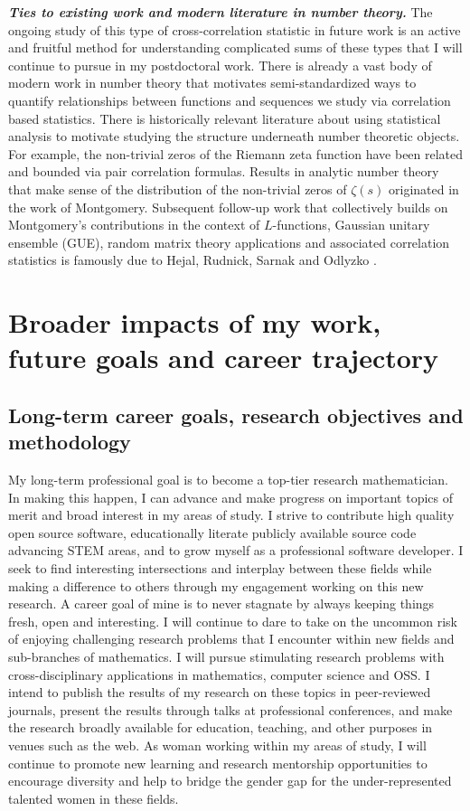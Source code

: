 \documentclass[10pt,reqno,letterpaper]{article}
\theoremstyle{plain}
\numberwithin{theorem}{section}
\theoremstyle{definition}
\begin{document}
\noindent
{\small \textbf{\emph{Ties to existing work and modern literature in number theory.}}} 
The ongoing study of this type of cross-correlation statistic in future work is an active and 
fruitful method for understanding complicated sums of these types 
that I will continue to pursue in my postdoctoral work. 
There is already a vast body of modern work in number theory that motivates 
semi-standardized ways to quantify relationships between functions and sequences we study via 
correlation based statistics. There is historically relevant literature about using 
statistical analysis to motivate studying the structure underneath number theoretic objects. 
For example, the non-trivial zeros of the Riemann zeta function have been related and 
bounded via pair correlation formulas. 
Results in analytic number theory that make sense of the distribution of the 
non-trivial zeros of $\zeta(s)$ originated in the work of Montgomery. 
Subsequent follow-up work that collectively builds on Montgomery’s contributions in the 
context of $L$-functions, Gaussian unitary ensemble (GUE), 
random matrix theory applications and associated correlation statistics is 
famously due to Hejal, Rudnick, Sarnak and Odlyzko 
\cite{WILLIAMS-BARRETT-SURVEY-2016}. 

\section{Broader impacts of my work, future goals and career trajectory}

\subsection{Long-term career goals, research objectives and methodology} 

My long-term professional goal is to become a top-tier research mathematician. In making this happen, 
I can advance and make progress on important topics of merit and broad interest in my areas of study. 
I strive to contribute high quality open source software, educationally 
literate publicly available source code advancing STEM areas, and to grow myself as a 
professional software developer. 
I seek to find interesting intersections and interplay between these fields while making 
a difference to others through my engagement working on this new research. 
A career goal of mine is to never stagnate by always keeping things 
fresh, open and interesting. I will continue to dare to take on the uncommon risk of enjoying 
challenging research problems that I encounter within new fields and 
sub-branches of mathematics. 
I will pursue stimulating research problems 
with cross-disciplinary applications in mathematics, computer science and OSS. I intend to 
publish the results of my research on these topics in peer-reviewed journals, present 
the results through talks at professional conferences, and make the research broadly 
available for education, teaching, and other purposes in venues such as the web. As 
woman working within my areas of study, I will continue to promote new learning 
and research mentorship opportunities to encourage diversity and help to bridge the gender 
gap for the under-represented talented women in these fields.
\end{document}
